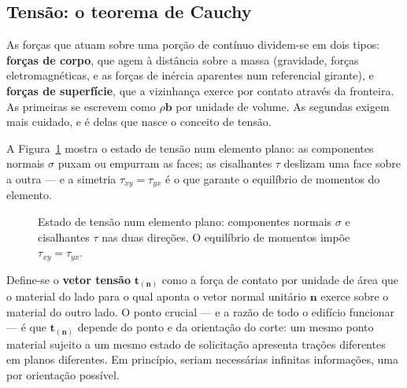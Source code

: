 \documentclass[12pt,a4paper]{article}
\numberwithin{equation}{section}
\numberwithin{table}{section}
\numberwithin{figure}{section}
\begin{document}
\subsection{Tensão: o teorema de Cauchy}\label{sub:v1-c2-tensao}

As forças que atuam sobre uma porção de contínuo dividem-se em dois tipos:
\textbf{forças de corpo}, que agem à distância sobre a massa (gravidade, forças
eletromagnéticas, e as forças de inércia aparentes num referencial girante), e
\textbf{forças de superfície}, que a vizinhança exerce por contato através da
fronteira. As primeiras se escrevem como $\rho\mathbf{b}$ por unidade de
volume. As segundas exigem mais cuidado, e é delas que nasce o conceito de
tensão.

A Figura~\ref{fig:v1-c2-2} mostra o estado de tensão num elemento plano: as
componentes normais $\sigma$ puxam ou empurram as faces; as cisalhantes
$\tau$ deslizam uma face sobre a outra --- e a simetria $\tau_{xy} =
\tau_{yx}$ é o que garante o equilíbrio de momentos do elemento.

\begin{figure}[H]
\centering
{}
\caption[Estado de tensão num elemento plano.]{Estado de tensão num
elemento plano: componentes normais $\sigma$ e cisalhantes $\tau$ nas duas
direções. O equilíbrio de momentos impõe $\tau_{xy} = \tau_{yx}$.}
\label{fig:v1-c2-2}
\end{figure}


Define-se o \textbf{vetor tensão} $\mathbf{t}_{(\mathbf{n})}$ como a força de
contato por unidade de área que o material do lado para o qual aponta o vetor
normal unitário $\mathbf{n}$ exerce sobre o material do outro lado. O ponto
crucial --- e a razão de todo o edifício funcionar --- é que
$\mathbf{t}_{(\mathbf{n})}$ depende do ponto e da orientação do corte: um mesmo
ponto material sujeito a um mesmo estado de solicitação apresenta trações
diferentes em planos diferentes. Em princípio, seriam necessárias infinitas
informações, uma por orientação possível.
\end{document}
